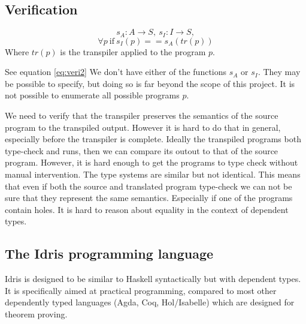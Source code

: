 \documentclass[parskip=half]{scrartcl}
\begin{document}

\subsection{Verification}

\begin{equation} \label{eq:veri1}
  s_A : A \rightarrow S,
  \ s_I : I \rightarrow S,
\end{equation}
\begin{equation} \label{eq:veri2}
  \forall p\ \text{if}\  s_I(p) == s_A (tr(p))
\end{equation}
Where $tr(p)$ is the transpiler applied to the program $p$.

See equation \ref{eq:veri2}
We don't have either of the functions $s_A$ or $s_I$. They may be possible to
specify, but doing so is far beyond the scope of this project.
It is not possible to enumerate all possible programs $p$.

We need to verify that the transpiler preserves the semantics of the source
program to the transpiled output. However it is hard to do that in general,
especially before the transpiler is complete.  Ideally the transpiled programs
both type-check and runs, then we can compare its outout to that of the source
program.  However, it is hard enough to get the programs to type check without
manual intervention. The type systems are similar but not identical. This means
that even if both the source and translated program type-check we can not be
sure that they represent the same semantics.  Especially if one of the programs
contain holes. It is hard to reason about equality in the context of dependent
types.

\subsection{The Idris programming language}
Idris is designed to be similar to Haskell syntactically but with dependent
types. It is specifically aimed at practical programming, compared to most
other dependently typed languages (Agda, Coq, Hol/Isabelle) which are designed
for theorem proving.
\end{document}
